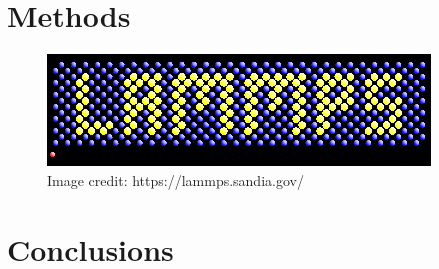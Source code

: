 \graphicspath{{figures/3/}}

\section{Methods}

\begin{figure}[H]
\centering
	\includegraphics[width=\textwidth]{lammps-logo.png}
    \caption[lammps logo]{Image credit: https://lammps.sandia.gov/}
    \label{lammps-logo}
\end{figure}

\section{Conclusions}
